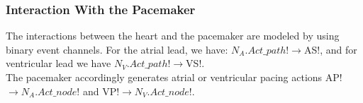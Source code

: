 \subsubsection{Interaction With the Pacemaker}
The interactions between the heart and the pacemaker are modeled by using binary event channels. For the atrial lead, we have:
\textsf{$N_A.Act\_path!\rightarrow$AS!},
and for ventricular lead we have
\textsf{$N_V.Act\_path!\rightarrow$VS!}.\\
The pacemaker accordingly generates atrial or ventricular pacing actions \textsf{AP!$\rightarrow N_A.Act\_node!$} and \textsf{VP!$\rightarrow N_V.Act\_node!$}.